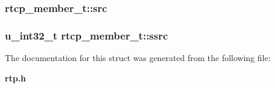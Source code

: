 \subsubsection{ {\bf rtcp\_\-member\_\-t::src}}\label{structrtcp__member__t_o2}


\subsubsection{\setlength{\rightskip}{0pt plus 5cm}u\_\-int32\_\-t {\bf rtcp\_\-member\_\-t::ssrc}}\label{structrtcp__member__t_o0}




The documentation for this struct was generated from the following file:\begin{CompactItemize}
\item 
{\bf rtp.h}\end{CompactItemize}
